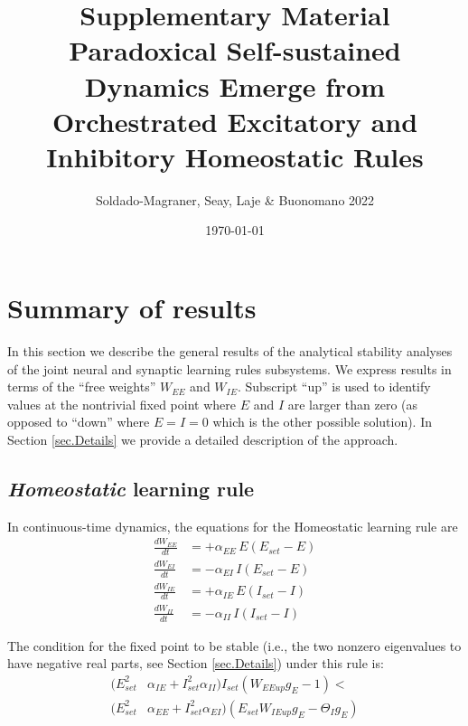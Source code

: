\documentclass[twocolumn]{article}
\newcommand{\EE}{\mathit{EE}}
\newcommand{\EI}{\mathit{EI}}
\newcommand{\IE}{\mathit{IE}}
\newcommand{\II}{\mathit{II}}
\newcommand{\set}{\mathit{set}}
\newcommand{\up}{\mathit{up}}
\begin{document}
\title{\vspace{-2.0cm}Supplementary Material\\{\bf Paradoxical Self-sustained Dynamics Emerge from Orchestrated Excitatory and Inhibitory Homeostatic Rules}}
\author{Soldado-Magraner, Seay, Laje \& Buonomano 2022}
\date{\today}

\maketitle

\tableofcontents

\section{Summary of results}

In this section we describe the general results of the analytical stability analyses of the joint neural and synaptic learning rules subsystems. We express results in terms of the ``free weights'' $W_{\EE}$ and $W_{\IE}$. Subscript ``up'' is used to identify values at the nontrivial fixed point where $E$ and $I$ are larger than zero (as opposed to ``down'' where $E=I=0$ which is the other possible solution). In Section \ref{sec.Details} we provide a detailed description of the approach.


\subsection{{\em Homeostatic} learning rule}

In continuous-time dynamics, the equations for the Homeostatic learning rule are
\begin{equation}
\begin{aligned}
\frac{dW_{\EE}}{dt} & = +\alpha_{\EE} \, E (E_{\set} - E) \\
\frac{dW_{\EI}}{dt} & = -\alpha_{\EI} \, I (E_{\set} - E) \\
\frac{dW_{\IE}}{dt} & = +\alpha_{\IE} \, E (I_{\set} - I) \\
\frac{dW_{\II}}{dt} & = -\alpha_{\II} \, I (I_{\set} - I)
\end{aligned}
\label{eq.SH_summary}
\end{equation}

\noindent The condition for the fixed point to be stable (i.e., the two nonzero eigenvalues to have negative real parts, see Section \ref{sec.Details}) under this rule is:
\begin{equation}
\begin{aligned}
(E_{\set}^2 & \alpha_{\IE} + I_{\set}^2 \alpha_{\II}) I_{\set}(W_{\EE\up} g_E - 1) < \\
(E_{\set}^2 & \alpha_{\EE} + I_{\set}^2 \alpha_{\EI}) (E_{\set} W_{\IE\up} g_E - \Theta_I g_E)
\end{aligned}
\label{eq.SH_stable_cond_v1_summary}
\end{equation}
\end{document}
